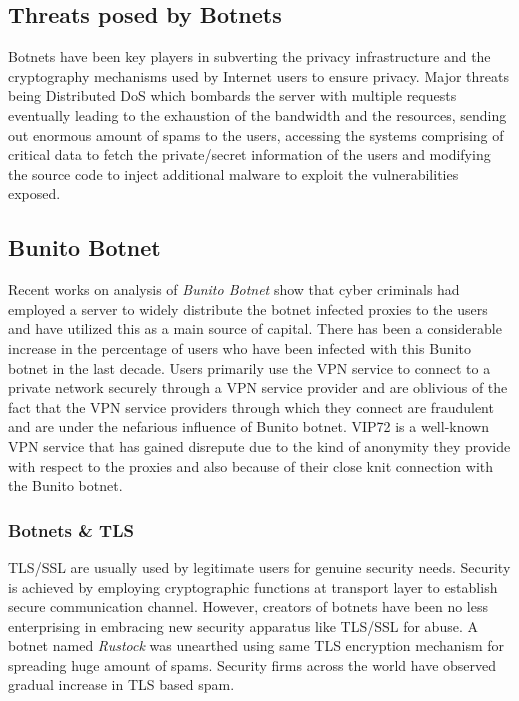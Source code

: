 \documentclass[letterpaper, 10 pt, conference]{ieeeconf}
\begin{document}
\subsection{Threats posed by Botnets}

Botnets have been key players in subverting the privacy infrastructure and the cryptography mechanisms used by Internet users to ensure privacy. Major threats being Distributed DoS which bombards the server with multiple requests eventually leading to the exhaustion of the bandwidth and the resources, sending out enormous amount of spams to the users, accessing the systems comprising of critical data to fetch the private/secret information of the users and modifying the source code to inject additional malware to exploit the vulnerabilities exposed.\\

\subsection{Bunito Botnet}

Recent works on analysis of \textit{Bunito Botnet} show that cyber criminals had employed a server to widely distribute the botnet infected proxies to the users and have utilized this as a main source of capital. There has been a considerable increase in the percentage of users who have been infected with this Bunito botnet in the last decade. Users primarily use the VPN service to connect to a private network securely through a VPN service provider and are oblivious of the fact that the VPN service providers through which they connect are fraudulent and are under the nefarious influence of Bunito botnet. VIP72 is a well-known VPN service that has gained disrepute due to the kind of anonymity they provide with respect to the proxies and also because of their close knit connection with the Bunito botnet.\\

\subsubsection{Botnets \& TLS}

TLS/SSL are usually used by legitimate users for genuine security needs. Security is achieved by employing cryptographic functions at transport layer to establish secure communication channel. However, creators of botnets have been no less enterprising in embracing new security apparatus like TLS/SSL for abuse. A botnet named \textit{Rustock} was unearthed using same TLS encryption mechanism for spreading huge amount of spams. Security firms across the world have observed gradual increase in TLS based spam.\\
\end{document}
